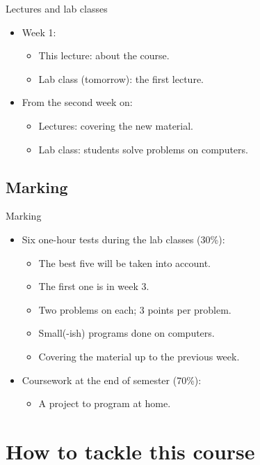 \documentclass[xcolor=dvipsnames, 12pt]{beamer}
\newcommand{\MYTITLECOLOUR} {\textcolor[rgb]{1.,0.85,0.}}  %
\newenvironment{myFrame}[1]%
{\begin{frame}{\MYTITLECOLOUR{#1}}}%
{\end{frame}}
\begin{document}
\begin{myFrame}{Lectures and lab classes}
\begin{itemize}
  \item Week 1:
    \begin{itemize}
      \item This lecture: about the course.
      \item Lab class (tomorrow): the first lecture.
    \end{itemize}
  \item From the second week on:
    \begin{itemize}
      \item Lectures: covering the new material.
      \item Lab class: students solve problems on computers.
    \end{itemize}
\end{itemize}
\end{myFrame}

\subsection{Marking}

\begin{myFrame}{Marking}
\begin{itemize}
  \item Six one-hour tests during the lab classes (30\%):
    \begin{itemize}
      \item The \alert{best five} will be taken into account.
      \item The first one is in week 3.
      \item Two problems on each; 3 points per problem.
      \item Small(-ish) programs done on computers.
      \item Covering the material up to the previous week.
    \end{itemize}
  \item Coursework at the end of semester (70\%):
    \begin{itemize}
      \item A project to program at home.
    \end{itemize}
\end{itemize}
\end{myFrame}



\section{How to tackle this course}
\end{document}
